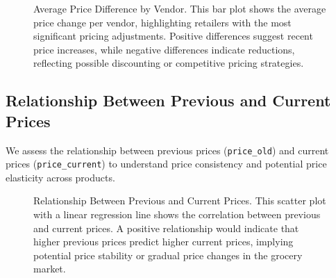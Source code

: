 \documentclass[
  letterpaper,
  DIV=11,
  numbers=noendperiod]{scrartcl}
\begin{document}
\begin{figure}


\caption{\label{fig-avg-price-diff}Average Price Difference by Vendor.
This bar plot shows the average price change per vendor, highlighting
retailers with the most significant pricing adjustments. Positive
differences suggest recent price increases, while negative differences
indicate reductions, reflecting possible discounting or competitive
pricing strategies.}

\end{figure}%

\subsection{Relationship Between Previous and Current
Prices}\label{relationship-between-previous-and-current-prices}

We assess the relationship between previous prices (\texttt{price\_old})
and current prices (\texttt{price\_current}) to understand price
consistency and potential price elasticity across products.

\begin{figure}


\caption{\label{fig-past-curr}Relationship Between Previous and Current
Prices. This scatter plot with a linear regression line shows the
correlation between previous and current prices. A positive relationship
would indicate that higher previous prices predict higher current
prices, implying potential price stability or gradual price changes in
the grocery market.}

\end{figure}%
\end{document}
